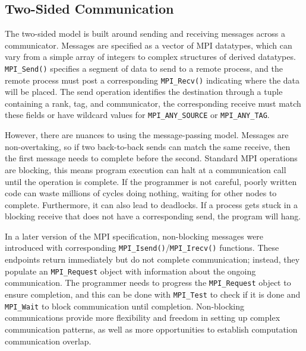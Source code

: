 \subsection{Two-Sided Communication}
The two-sided model is built around sending and receiving messages across a communicator.
Messages are specified as a vector of \gls{MPI} datatypes, which can vary from a simple array of integers to complex structures of derived datatypes.
\texttt{MPI\_Send()} specifies a segment of data to send to a remote process, and the remote process must post a corresponding \texttt{MPI\_Recv()} indicating where the data will be placed. 
The send operation identifies the destination through a tuple containing a rank, tag, and communicator, the corresponding receive must match these fields or have wildcard values for \texttt{MPI\_ANY\_SOURCE} or \texttt{MPI\_ANY\_TAG}.

However, there are nuances to using the message-passing model.
Messages are non-overtaking, so if two back-to-back sends can match the same receive, then the first message needs to complete before the second.
Standard \gls{MPI} operations are blocking, this means program execution can halt at a communication call until the operation is complete.
If the programmer is not careful, poorly written code can waste millions of cycles doing nothing, waiting for other nodes to complete.
Furthermore, it can also lead to deadlocks.
If a process gets stuck in a blocking receive that does not have a corresponding send, the program will hang.

In a later version of the \gls{MPI} specification, non-blocking messages were introduced with corresponding \texttt{MPI\_Isend()}/\texttt{MPI\_Irecv()} functions.
These endpoints return immediately but do not complete communication; instead, they populate an \texttt{MPI\_Request} object with information about the ongoing communication.
The programmer needs to progress the \texttt{MPI\_Request} object to ensure completion, and this can be done with \texttt{MPI\_Test} to check if it is done and \texttt{MPI\_Wait} to block communication until completion.
Non-blocking communications provide more flexibility and freedom in setting up complex communication patterns, as well as more opportunities to establish computation communication overlap.

